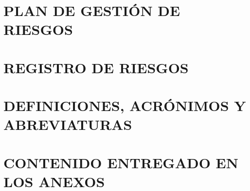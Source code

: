 \section*{PLAN DE GESTIÓN DE RIESGOS}
{}
\hypertarget{anexo:plan_de_gestion_de_riesgos}{}


\newpage
\section*{REGISTRO DE RIESGOS}
{}
\hypertarget{anexo:registro_de_riesgos}{}


\newpage
\section*{DEFINICIONES, ACRÓNIMOS Y ABREVIATURAS}
{}


\newpage
\section*{CONTENIDO ENTREGADO EN LOS ANEXOS} 
